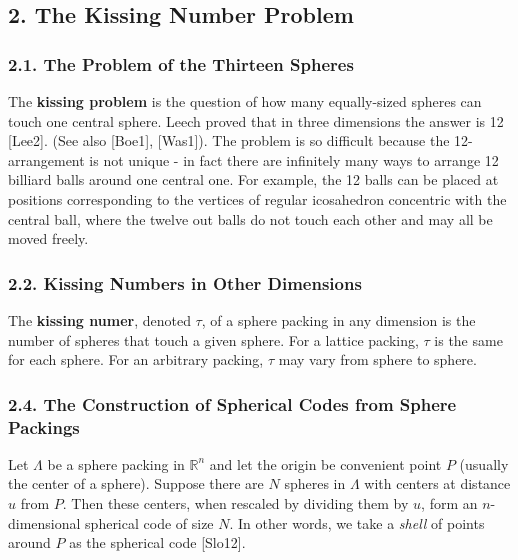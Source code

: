 \documentclass{article}
\newcommand{\R}{\mathbb{R}}
\begin{document}

\subsection*{2. The Kissing Number Problem}

\subsubsection*{2.1. The Problem of the Thirteen Spheres}

The \textbf{kissing problem} is the question of how many equally-sized spheres can touch one central sphere.
Leech proved that in three dimensions the answer is 12 [Lee2]. (See also [Boe1], [Was1]).
The problem is so difficult because the 12-arrangement is not unique - in fact there are infinitely many ways to arrange 12 billiard balls around one central one.
For example, the 12 balls can be placed at positions corresponding to the vertices of regular icosahedron concentric with the central ball, where the twelve out balls do not touch each other and may all be moved freely.

\subsubsection*{2.2. Kissing Numbers in Other Dimensions}

The \textbf{kissing numer}, denoted $\tau$, of a sphere packing in any dimension is the number of spheres that touch a given sphere.
For a lattice packing, $\tau$ is the same for each sphere.
For an arbitrary packing, $\tau$ may vary from sphere to sphere.


\subsubsection*{2.4. The Construction of Spherical Codes from Sphere Packings}

Let $\Lambda$ be a sphere packing in $\R^n$
and let the origin be convenient point $P$ (usually the center of a sphere).
Suppose there are $N$ spheres in $\Lambda$ with centers at distance $u$ from $P$.
Then these centers, when rescaled by dividing them by $u$, form an $n$-dimensional spherical code of size $N$.
In other words, we take a \textit{shell} of points around $P$ as the spherical code [Slo12].
\end{document}
